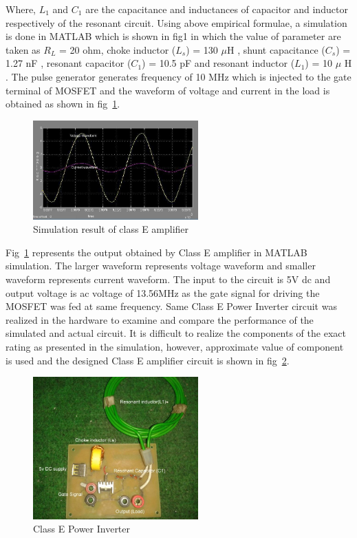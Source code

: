 \documentclass[journal,twoside]{IEEEtran}
\begin{document}
Where, $L_1$ and $C_1$ are the capacitance and inductances of
capacitor and inductor respectively of the resonant circuit.
Using above empirical formulae, a simulation is done in
MATLAB which is shown in fig1 in which the value of
parameter are taken as $R_L$ = 20 ohm, choke inductor ($L_s$) =
130 $\mu$H , shunt capacitance ($C_s$) = 1.27 nF , resonant
capacitor ($C_1$) = 10.5 pF and resonant inductor ($L_1$) = 10 $\mu$ H .
The pulse generator generates frequency of 10 MHz which is
injected to the gate terminal of MOSFET and the waveform
of voltage and current in the load is obtained as shown in fig~\ref{fig_4}.
\begin{figure}[!ht]
\centering
\includegraphics[width=2.5in]{4}
\caption{Simulation result of class E amplifier}
\label{fig_4}
\end{figure}
Fig~\ref{fig_4} represents the output obtained by Class E amplifier in
MATLAB simulation. The larger waveform represents
voltage waveform and smaller waveform represents current
waveform. The input to the circuit is 5V dc and output voltage is ac voltage of 13.56MHz as the gate signal for
driving the MOSFET was fed at same frequency.
Same Class E Power Inverter circuit was realized in the
hardware to examine and compare the performance of the
simulated and actual circuit. It is difficult to realize the
components of the exact rating as presented in the simulation,
however, approximate value of component is used and the
designed Class E amplifier circuit is shown in fig~\ref{fig_5}.
\begin{figure}[!ht]
\centering
\includegraphics[width=2.5in]{5}
\caption{Class E Power Inverter}
\label{fig_5}
\end{figure}
\end{document}
